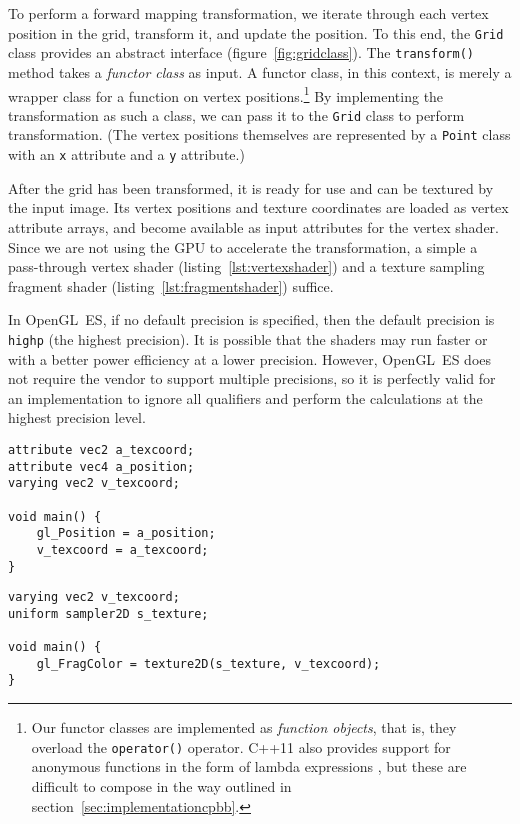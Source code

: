 \documentclass[english,12pt]{ifimaster}
\begin{document}
To perform a forward mapping transformation, we iterate through each
vertex position in the grid, transform it, and update the position. To
this end, the \lstinline|Grid| class provides an abstract interface
(figure~\ref{fig:gridclass}). The \lstinline|transform()| method takes
a \emph{functor class} as input. A functor class, in this context, is
merely a wrapper class for a function on vertex
positions.\footnote{Our functor classes are implemented as
  \emph{function objects}, that is, they overload the
  \lstinline|operator()| operator. C++11 also provides support for
  anonymous functions in the form of lambda expressions
  \citep{stroustrup13:-cpp-lang}, but these are difficult to compose
  in the way outlined in section~\ref{sec:implementationcpbb}.} By
implementing the transformation as such a class, we can pass it to the
\lstinline|Grid| class to perform transformation. (The vertex
positions themselves are represented by a \lstinline|Point| class with
an \lstinline|x| attribute and a \lstinline|y| attribute.)

After the grid has been transformed, it is ready for use and can be
textured by the input image. Its vertex positions and texture
coordinates are loaded as vertex attribute arrays, and become
available as input attributes for the vertex shader. Since we are not
using the GPU to accelerate the transformation, a simple a
pass-through vertex shader (listing~\ref{lst:vertexshader}) and a
texture sampling fragment shader (listing~\ref{lst:fragmentshader})
suffice.

In OpenGL~ES, if no default precision is specified, then the default
precision is \lstinline|highp| (the highest precision). It is possible
that the shaders may run faster or with a better power efficiency at a
lower precision. However, OpenGL~ES does not require the vendor to
support multiple precisions, so it is perfectly valid for an
implementation to ignore all qualifiers and perform the calculations
at the highest precision level.

\begin{lstlisting}[frame=lines,label=lst:vertexshader,caption=Pass-through vertex shader]
attribute vec2 a_texcoord;
attribute vec4 a_position;
varying vec2 v_texcoord;

void main() {
    gl_Position = a_position;
    v_texcoord = a_texcoord;
}
\end{lstlisting}

\begin{lstlisting}[frame=lines,label=lst:fragmentshader,caption=Texture sampling fragment shader]
varying vec2 v_texcoord;
uniform sampler2D s_texture;

void main() {
    gl_FragColor = texture2D(s_texture, v_texcoord);
}
\end{lstlisting}
\end{document}
